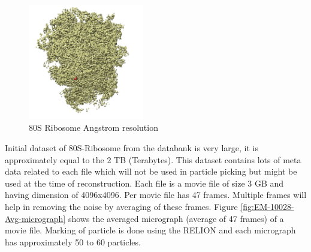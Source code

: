 \documentclass[twoside]{iitbreport}
\begin{document}
\begin{figure}[h]
\includegraphics[width=0.45\textwidth]{EMPIAR-10028}
\centering
\captionsetup{justification=centering}
\caption{80S Ribosome\protect{} Angstrom resolution}
\label{fig:EMPIAR-10028-3d-struct}
\end{figure}

Initial dataset of 80S-Ribosome from the databank is very large, it is approximately equal to the 2 TB (Terabytes). This dataset contains lots of meta data related to each file which will not be used in particle picking but might be used at the time of reconstruction. Each file is a movie file of size 3 GB and having dimension of 4096x4096. Per movie file has 47 frames. Multiple frames will help in removing the noise by averaging of these frames. Figure \ref{fig:EM-10028-Avg-micrograph} shows the averaged micrograph (average of 47 frames) of a movie file. Marking of particle is done using the RELION and each micrograph has approximately 50 to 60 particles.
\end{document}
